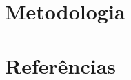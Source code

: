 \documentclass[a4paper,12pt]{article}
\title \DOCTITLE
\author \SURNAMES
\date \FULLDATE
\begin{document}
        
        
        
        
        

        \tableofcontents
        \thispagestyle{empty}
        \newpage
            
            
            
        \newpage
        \section{Metodologia}
        \newpage
        \section{Referências}
        
        
    
\end{document}

